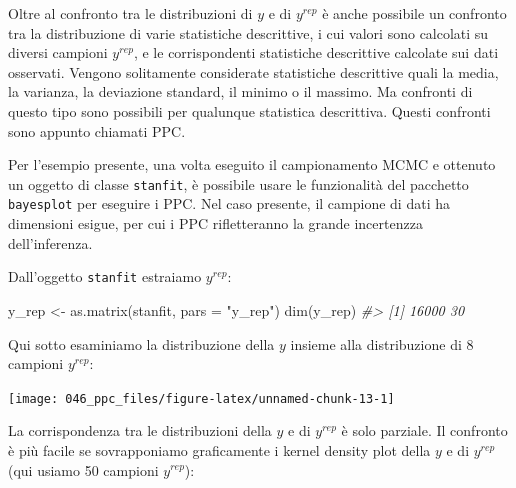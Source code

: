 \documentclass[
  10pt,
  italian,
  a4paper,
  extrafontsizes,onecolumn,openright
  ]{memoir}
\newenvironment{Shaded}{\begin{snugshade}}{\end{snugshade}}
\newcommand{\AttributeTok}[1]{\textcolor[rgb]{0.77,0.63,0.00}{#1}}
\newcommand{\CommentTok}[1]{\textcolor[rgb]{0.56,0.35,0.01}{\textit{#1}}}
\newcommand{\DecValTok}[1]{\textcolor[rgb]{0.00,0.00,0.81}{#1}}
\newcommand{\FunctionTok}[1]{\textcolor[rgb]{0.00,0.00,0.00}{#1}}
\newcommand{\NormalTok}[1]{#1}
\newcommand{\OtherTok}[1]{\textcolor[rgb]{0.56,0.35,0.01}{#1}}
\newcommand{\SpecialCharTok}[1]{\textcolor[rgb]{0.00,0.00,0.00}{#1}}
\newcommand{\StringTok}[1]{\textcolor[rgb]{0.31,0.60,0.02}{#1}}
\begin{document}
Oltre al confronto tra le distribuzioni di \(y\) e di \(y^{rep}\) è anche possibile un confronto tra la distribuzione di varie statistiche descrittive, i cui valori sono calcolati su diversi campioni \(y^{rep}\), e le corrispondenti statistiche descrittive calcolate sui dati osservati. Vengono solitamente considerate statistiche descrittive quali la media, la varianza, la deviazione standard, il minimo o il massimo. Ma confronti di questo tipo sono possibili per qualunque statistica descrittiva. Questi confronti sono appunto chiamati PPC.

Per l'esempio presente, una volta eseguito il campionamento MCMC e ottenuto un oggetto di classe \texttt{stanfit}, è possibile usare le funzionalità del pacchetto \texttt{bayesplot} per eseguire i PPC. Nel caso presente, il campione di dati ha dimensioni esigue, per cui i PPC rifletteranno la grande incertenzza dell'inferenza.

Dall'oggetto \texttt{stanfit} estraiamo \(y^{rep}\):

\begin{Shaded}
\begin{Highlighting}[]
\NormalTok{y\_rep }\OtherTok{\textless{}{-}} \FunctionTok{as.matrix}\NormalTok{(stanfit, }\AttributeTok{pars =} \StringTok{"y\_rep"}\NormalTok{)}
\FunctionTok{dim}\NormalTok{(y\_rep)}
\CommentTok{\#\textgreater{} [1] 16000    30}
\end{Highlighting}
\end{Shaded}

\noindent
Qui sotto esaminiamo la distribuzione della \(y\) insieme alla distribuzione di 8 campioni \(y^{rep}\):

\begin{Shaded}
\end{Shaded}

\begin{center}\texttt{[image: 046\_ppc\_files/figure-latex/unnamed-chunk-13-1]} \end{center}

La corrispondenza tra le distribuzioni della \(y\) e di \(y^{rep}\) è solo parziale. Il confronto è più facile se sovrapponiamo graficamente i kernel density plot della \(y\) e di \(y^{rep}\) (qui usiamo 50 campioni \(y^{rep}\)):
\end{document}
